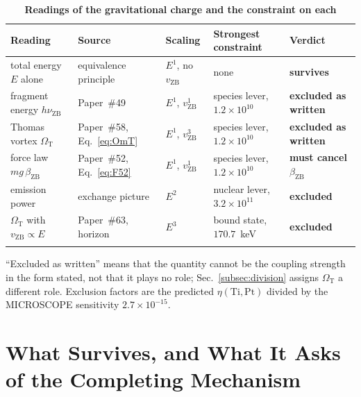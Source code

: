 \documentclass[%
 reprint, amsmath,amssymb, aps, prb, ]{revtex4-2}
\numberwithin{equation}{section}
\newcommand{\vZB}{v_{\text{ZB}}}
\newcommand{\betaZB}{\beta_{\text{ZB}}}
\newcommand{\nuZB}{\nu_{\text{ZB}}}
\newcommand{\OmT}{\Omega_{\text{T}}}
\begin{document}
\begin{table}[t!]
\centering
\caption{\textbf{Readings of the gravitational charge and the constraint on each}}
\label{tab:verdict}
\renewcommand{\arraystretch}{1.4}
\setlength{\tabcolsep}{8pt}
\begin{tabular}{>{\raggedright\arraybackslash}p{3.4cm}>{\raggedright\arraybackslash}p{2.6cm}>{\raggedright\arraybackslash}p{2.2cm}>{\raggedright\arraybackslash}p{3.6cm}>{\raggedright\arraybackslash}p{2.4cm}}
\toprule
\textbf{Reading} & \textbf{Source} & \textbf{Scaling} & \textbf{Strongest constraint} & \textbf{Verdict} \\
\midrule
total energy $E$ alone & equivalence principle & $E^{1}$, no $\vZB$ & none & \textcolor{pass}{\textbf{survives}} \\
\addlinespace[0.3cm]
fragment energy $h\nuZB$ & Paper~\#49 & $E^{1}$, $\vZB^{1}$ & species lever, $1.2\times10^{10}$ & \textcolor{fail}{\textbf{excluded as written}} \\
\addlinespace[0.3cm]
Thomas vortex $\OmT$ & Paper~\#58, Eq.~\eqref{eq:OmT} & $E^{1}$, $\vZB^{3}$ & species lever, $1.2\times10^{10}$ & \textcolor{fail}{\textbf{excluded as written}} \\
\addlinespace[0.3cm]
force law $mg\,\betaZB$ & Paper~\#52, Eq.~\eqref{eq:F52} & $E^{1}$, $\vZB^{1}$ & species lever, $1.2\times10^{10}$ & \textcolor{kB}{\textbf{must cancel $\betaZB$}} \\
\addlinespace[0.3cm]
emission power & exchange picture & $E^{2}$ & nuclear lever, $3.2\times10^{11}$ & \textcolor{fail}{\textbf{excluded}} \\
\addlinespace[0.3cm]
$\OmT$ with $\vZB \propto E$ & Paper~\#63, horizon & $E^{3}$ & bound state, $170.7$~keV & \textcolor{fail}{\textbf{excluded}} \\
\addlinespace[0.2cm]
\bottomrule
\end{tabular}
\vspace{0.2cm}
\begin{minipage}{0.95\textwidth}
\justifying\footnotesize
``Excluded as written'' means that the quantity cannot be the coupling strength in the form stated, not that it plays no role; Sec.~\ref{subsec:division} assigns $\OmT$ a different role. Exclusion factors are the predicted $\eta(\mathrm{Ti},\mathrm{Pt})$ divided by the MICROSCOPE sensitivity $2.7\times10^{-15}$.
\end{minipage}
\end{table}

\section{What Survives, and What It Asks of the Completing Mechanism}
\label{sec:survives}
\end{document}
